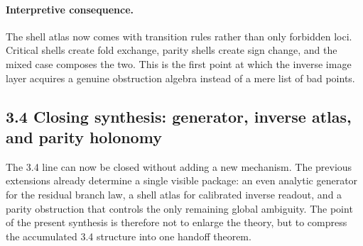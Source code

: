 \documentclass[12pt,a4paper]{article}
\begin{document}
\paragraph{Interpretive consequence.}
The shell atlas now comes with transition rules rather than only forbidden loci. Critical shells create fold exchange, parity shells create sign change, and the mixed case composes the two. This is the first point at which the inverse image layer acquires a genuine obstruction algebra instead of a mere list of bad points.


\subsection*{3.4 Closing synthesis: generator, inverse atlas, and parity holonomy}
The 3.4 line can now be closed without adding a new mechanism. The previous extensions already determine a single visible package: an even analytic generator for the residual branch law, a shell atlas for calibrated inverse readout, and a parity obstruction that controls the only remaining global ambiguity. The point of the present synthesis is therefore not to enlarge the theory, but to compress the accumulated 3.4 structure into one handoff theorem.
\end{document}

